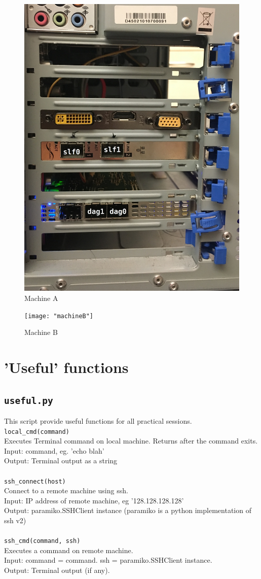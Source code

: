 \documentclass[]{scrartcl}
\begin{document}
	\begin{figure}
		\includegraphics[width=0.45\linewidth]{"machineA"}
		\centering
		\caption{Machine A}
		\label{fig:machA}
	\end{figure}

	\begin{figure}
		\texttt{[image: "machineB"]}
		\centering
		\caption{Machine B}
		\label{fig:machB}
	\end{figure}
	\FloatBarrier
	
\section{'Useful' functions}\label{sec:useful}

\subsection{\texttt{useful.py}}
This script provide useful functions for all practical sessions.\\

\noindent\texttt{local{\_}cmd(command)}  \\
Executes Terminal command on local machine. Returns after the command exits.  \\
Input: command, eg. 'echo blah'  \\
Output: Terminal output as a string \\
\\
\texttt{ssh{\_}connect(host)}  \\
Connect to a remote machine using ssh.\\
Input: IP address of remote machine, eg '128.128.128.128'  \\
Output: paramiko.SSHClient instance (paramiko is a python implementation of ssh v2) \\
\\
\texttt{ssh{\_}cmd(command, ssh)}  \\
Executes a command on remote machine.  \\
Input: command = command. ssh = paramiko.SSHClient instance.  \\
Output: Terminal output (if any).
\\
\end{document}

